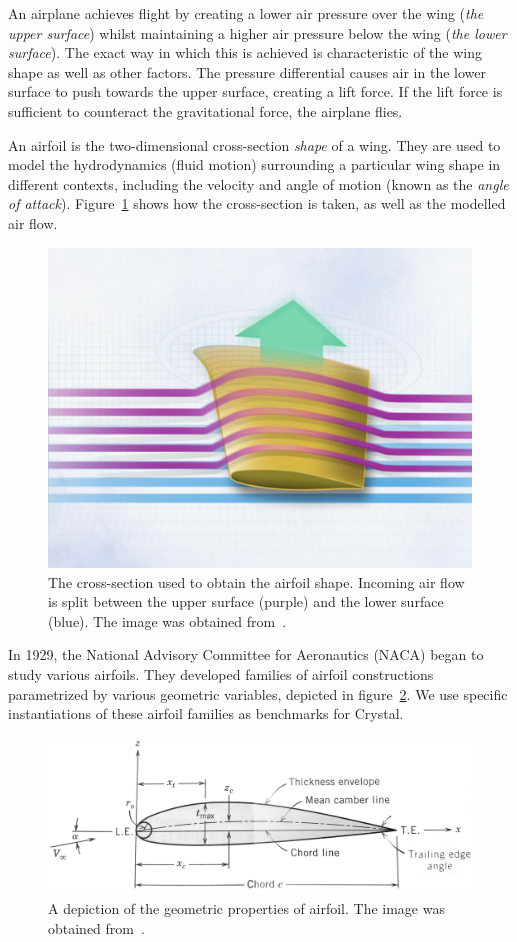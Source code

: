 An airplane achieves flight by creating a lower air pressure over the wing (\emph{the upper surface}) whilst maintaining a higher air pressure below the wing (\emph{the lower surface}). The exact way in which this is achieved is characteristic of the wing shape as well as other factors. The pressure differential causes air in the lower surface to push towards the upper surface, creating a lift force. If the lift force is sufficient to counteract the gravitational force, the airplane flies.

An airfoil is the two-dimensional cross-section \emph{shape} of a wing. They are used to model the hydrodynamics (fluid motion) surrounding a particular wing shape in different contexts, including the velocity and angle of motion (known as the \emph{angle of attack}). Figure~\ref{fig:airfoil-crosscut} shows how the cross-section is taken, as well as the modelled air flow.

\begin{figure}
\includegraphics[width=\imagewidth]{images/background/airfoil_crosscut.jpg}
    \caption{The cross-section used to obtain the airfoil shape. Incoming air flow is split between the upper surface (purple) and the lower surface (blue). The image was obtained from~\cite{boeing2014airfoil}.}
    \label{fig:airfoil-crosscut}
\end{figure}


In 1929, the National Advisory Committee for Aeronautics (NACA) began to study various airfoils. They developed families of airfoil constructions parametrized by various geometric variables, depicted in figure~\ref{fig:airfoil-geometry}. We use specific instantiations of these airfoil families as benchmarks for Crystal.

\begin{figure}
\includegraphics[width=\imagewidth]{images/background/airfoil.png}
    \caption{A depiction of the geometric properties of airfoil. The image was obtained from~\cite{kuethe1986foundations}.}
    \label{fig:airfoil-geometry}
\end{figure}
